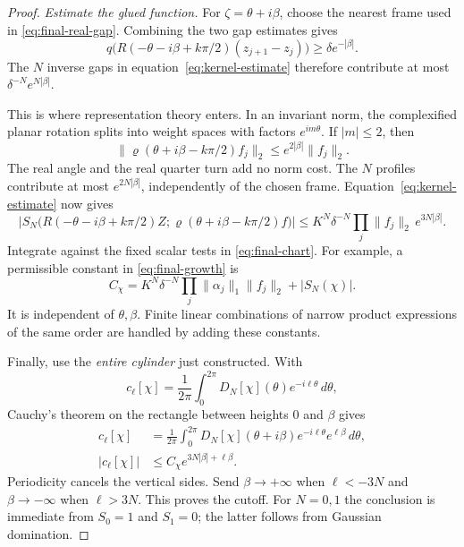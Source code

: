 \documentclass[11pt, letterpaper, reqno]{amsart}
\theoremstyle{definition}
\theoremstyle{remark}
\begin{document}
\begin{proof}
\emph{Estimate the glued function.}
For $\zeta=\theta+i\beta$, choose the nearest frame used in
\eqref{eq:final-real-gap}. Combining the two gap estimates gives
\[
 q\bigl(R(-\theta-i\beta+k\pi/2)(z_{j+1}-z_j)\bigr)
 \ge \delta e^{-|\beta|}.
\]
The $N$ inverse gaps in equation~\eqref{eq:kernel-estimate} therefore contribute
at most $\delta^{-N}e^{N|\beta|}$.

This is where representation theory enters. In an invariant norm, the
complexified planar rotation splits into weight spaces with factors
$e^{im\theta}$. If $|m|\le2$, then
\begin{equation}\label{eq:final-tensor}
 \|\varrho(\theta+i\beta-k\pi/2)f_j\|_2
 \le e^{2|\beta|}\|f_j\|_2.
\end{equation}
The real angle and the real quarter turn add no norm cost. The $N$
profiles contribute at most $e^{2N|\beta|}$, independently of the chosen
frame. Equation~\eqref{eq:kernel-estimate} now gives
\begin{equation}\label{eq:final-rotated-kernel}
 \left|S_N\bigl(R(-\theta-i\beta+k\pi/2)Z;
                      \varrho(\theta+i\beta-k\pi/2)f\bigr)\right|
 \le K^N\delta^{-N}\prod_j\|f_j\|_2\,e^{3N|\beta|}.
\end{equation}
Integrate against the fixed scalar tests in \eqref{eq:final-chart}.
For example, a permissible constant in \eqref{eq:final-growth} is
\[
 C_\chi=K^N\delta^{-N}\prod_j\|\alpha_j\|_1\|f_j\|_2
             +|S_N(\chi)|.
\]
It is independent of $\theta,\beta$. Finite linear combinations of
narrow product expressions of the same order are handled by adding
these constants.

Finally, use the \emph{entire cylinder} just constructed. With
\[
 c_\ell[\chi]=\frac1{2\pi}\int_0^{2\pi}
                   D_N[\chi](\theta)e^{-i\ell\theta}\,d\theta,
\]
Cauchy's theorem on the rectangle between heights $0$ and $\beta$ gives
\begin{equation}\label{eq:final-contour}
 \begin{split}
 c_\ell[\chi]
 &=\frac1{2\pi}\int_0^{2\pi}
 D_N[\chi](\theta+i\beta)e^{-i\ell\theta}e^{\ell\beta}\,d\theta,\\
 |c_\ell[\chi]|&\le C_\chi e^{3N|\beta|+\ell\beta}.
 \end{split}
\end{equation}
Periodicity cancels the vertical sides. Send $\beta\to+\infty$ when
$\ell<-3N$ and $\beta\to-\infty$ when $\ell>3N$. This proves the cutoff.
For $N=0,1$ the conclusion is immediate from $S_0=1$ and $S_1=0$;
the latter follows from Gaussian domination.
\end{proof}
\end{document}
